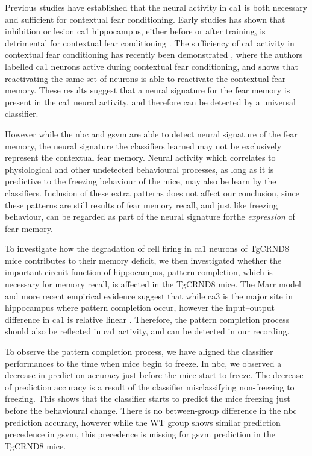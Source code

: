 Previous studies have established that the neural activity in \gls{ca1} is both necessary and sufficient for contextual fear conditioning. Early studies has shown that inhibition or lesion \gls{ca1} hippocampus, either before or after training, is detrimental for contextual fear conditioning \citep{maren01}. The sufficiency of \gls{ca1} activity in contextual fear conditioning has recently been demonstrated \citep{ryan15, roy16}, where the authors labelled \gls{ca1} neurons active during contextual fear conditioning, and shows that reactivating the same set of neurons is able to reactivate the contextual fear memory. These results suggest that a neural signature for the fear memory is present in the \gls{ca1} neural activity, and therefore can be detected by a universal classifier. 

However while the \gls{nbc} and \gls{gsvm} are able to detect neural signature of the fear memory, the neural signature the classifiers learned may not be exclusively represent the contextual fear memory. Neural activity which correlates to physiological and other undetected behavioural processes, as long as it is predictive to the freezing behaviour of the mice, may also be learn by the classifiers. Inclusion of these extra patterns does not affect our conclusion, since these patterns are still results of fear memory recall, and just like freezing behaviour, can be regarded as part of the neural signature forthe \textit{expression} of fear memory. 

To investigate how the degradation of cell firing in \gls{ca1} neurons of TgCRND8 mice contributes to their memory deficit, we then investigated whether the important circuit function of hippocampus, pattern completion, which is necessary for memory recall, is affected in the TgCRND8 mice. The Marr model and more recent empirical evidence \citep{rolls13, neunuebel14} suggest that while \gls{ca3} is the major site in hippocampus where pattern completion occur, however the input--output difference in \gls{ca1} is relative linear \citep{neunuebel14, knierim16}. Therefore, the pattern completion process should also be reflected in \gls{ca1} activity, and can be detected in our recording.

To observe the pattern completion process, we have aligned the classifier performances to the time when mice begin to freeze. In \gls{nbc}, we observed a decrease in prediction accuracy just before the mice start to freeze. The decrease of prediction accuracy is a result of the classifier misclassifying non-freezing to freezing. This shows that the classifier starts to predict the mice freezing just before the behavioural change. There is no between-group difference in the \gls{nbc} prediction accuracy, however while the WT group shows similar prediction precedence in \gls{gsvm}, this precedence is missing for \gls{gsvm} prediction in the TgCRND8 mice. 

